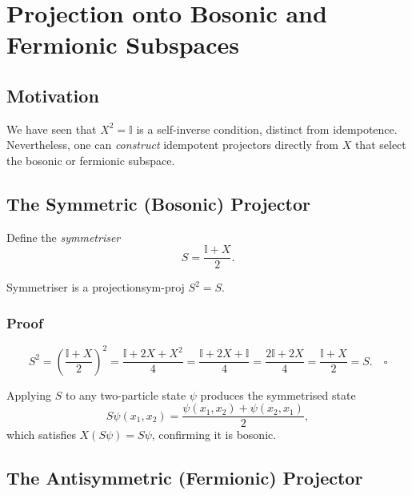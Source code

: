 \documentclass[11pt,a4paper]{article}
\newcommand{\id}{\mathbb{I}}
\begin{document}
\section{Projection onto Bosonic and Fermionic Subspaces}
\label{sec:projections-exchange}

\subsection{Motivation}

We have seen that $X^2 = \id$ is a self-inverse condition, distinct from
idempotence.  Nevertheless, one can \emph{construct} idempotent projectors
directly from $X$ that select the bosonic or fermionic subspace.

\subsection{The Symmetric (Bosonic) Projector}

Define the \emph{symmetriser}
\[
  S = \frac{\id + X}{2}.
\]

\begin{prop}{Symmetriser is a projection}{sym-proj}
  $S^2 = S$.
\end{prop}

\subsubsection{Proof}

\[
  S^2 = \left(\frac{\id + X}{2}\right)^2
       = \frac{\id + 2X + X^2}{4}
       = \frac{\id + 2X + \id}{4}
       = \frac{2\id + 2X}{4}
       = \frac{\id + X}{2}
       = S. \quad\square
\]

Applying $S$ to any two-particle state $\psi$ produces the symmetrised state
\[
  S\psi(x_1,x_2) = \frac{\psi(x_1,x_2)+\psi(x_2,x_1)}{2},
\]
which satisfies $X(S\psi) = S\psi$, confirming it is bosonic.

\subsection{The Antisymmetric (Fermionic) Projector}
\end{document}
